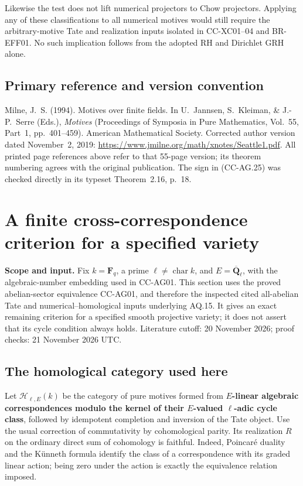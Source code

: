 \documentclass[11pt,a4paper]{article}
\theoremstyle{definition}\newtheorem{definition}[theorem]{Definition}
\theoremstyle{remark}\newtheorem{remark}[theorem]{Remark}
\begin{document}
Likewise the test does not lift numerical projectors to
Chow projectors.  Applying any of these classifications
to all numerical motives would still require the
arbitrary-motive Tate and realization inputs isolated in
CC-XC01--04 and BR-EFF01.  No such implication follows
from the adopted RH and Dirichlet GRH alone.

\subsection{Primary reference and version convention}

Milne, J.~S. (1994). Motives over finite fields. In
U.~Jannsen, S.~Kleiman, \& J.-P.~Serre (Eds.),
\emph{Motives} (Proceedings of Symposia in Pure Mathematics,
Vol.~55, Part~1, pp.~401--459). American Mathematical
Society. Corrected author version dated November~2, 2019:
\url{https://www.jmilne.org/math/xnotes/Seattle1.pdf}.
All printed page references above refer to that 55-page
version; its theorem numbering agrees with the original
publication.  The sign in (CC-AG.25) was checked directly
in its typeset Theorem~2.16, p.~18.


\section{A finite cross-correspondence criterion for a specified
variety}\label{a-finite-cross-correspondence-criterion-for-a-specified-variety}

\textbf{Scope and input.} Fix \(k=\mathbf F_q\), a prime
\(\ell\ne\operatorname{char}k\), and \(E=\overline{\mathbf Q}_\ell\),
with the algebraic-number embedding used in CC-AG01. This section uses
the proved abelian-sector equivalence CC-AG01, and therefore the
inspected cited all-abelian Tate and numerical--homological inputs
underlying AQ.15. It gives an exact remaining criterion for a specified
smooth projective variety; it does not assert that its cycle condition
always holds. Literature cutoff: 20 November 2026; proof checks: 21
November 2026 UTC.

\subsection{The homological category used
here}\label{the-homological-category-used-here}

Let \(\mathcal H_{\ell,E}(k)\) be the category of pure motives formed
from \textbf{\(E\)-linear algebraic correspondences modulo the kernel of
their \(E\)-valued \(\ell\)-adic cycle class}, followed by idempotent
completion and inversion of the Tate object. Use the usual correction of
commutativity by cohomological parity. Its realization \(R\) on the
ordinary direct sum of cohomology is faithful. Indeed, Poincaré duality
and the Künneth formula identify the class of a correspondence with its
graded linear action; being zero under the action is exactly the
equivalence relation imposed.
\end{document}
